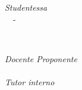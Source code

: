 \begin{titlepage}
    \vspace{1.9cm}
    
    \begin{minipage}{0.4\textwidth}
        \begin{flushleft} \large
            \emph{Studentessa}\\
            \nomeStudente\ \cognomeStudente\ - \matricolaStudente
        \end{flushleft}
    \end{minipage}
    ~
    \begin{minipage}{0.4\textwidth}
        \begin{flushright} \large
            \emph{Docente Proponente} \\
            \titoloDocenteProponente\ \nomeDocenteProponente\ \cognomeDocenteProponente\ \\
            \emph{Tutor interno} \\
            \titoloTutorInterno\ \nomeTutorInterno\ \cognomeTutorInterno\ \\
        \end{flushright}
    \end{minipage}\\[2cm]
    
    \vfill
\end{titlepage}
